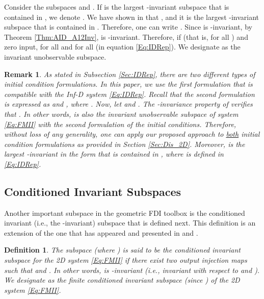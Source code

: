 \documentclass[journal,12pt,draftcls,onecolumn]{IEEEtran}
\def\QEDclosed{\hfill\IEEEQEDclosed}
\renewcommand{\qed}{\QEDclosed}
\newtheorem{remark}{Remark}
\newtheorem{definition}{Definition}
\begin{document}
Consider the subspaces  and . If  is the largest -invariant subspace that is contained in , we denote . We have shown in \cite{ACC2013} that , and it is the largest -invariant subspace that is contained in . Therefore,  one can write . Since  is -invariant, by Theorem \ref{Thm:AID_A12Inv},  is -invariant. Therefore, if  (that is,  for all ) and zero input,  for all  and  for all  (in equation \eqref{Eq:IDRep}). We designate   as the invariant unobservable subspace.
\begin{remark}\label{Rem:InitCond}
	As stated in Subsection \ref{Sec:IDRep}, there are two different types of initial condition formulations. In this paper, we use the first formulation that is compatible with the Inf-D system \eqref{Eq:IDRep}. Recall that the second formulation is expressed as  and , where .  Now, let  and . The -invariance property of  verifies that . In other words,  is also the invariant unobservable subspace of system \eqref{Eq:FMII} with the second formulation of the initial conditions. Therefore, without loss of any generality, one can apply our proposed approach to \underline{both} initial condition formulations as provided in Section \ref{Sec:Dis_2D}. Moreover,  is the largest -invariant in the form  that is contained in , where  is defined in \eqref{Eq:IDRep}.
\end{remark}


\subsection{Conditioned Invariant Subspaces}

Another important subspace in the geometric FDI toolbox is the conditioned invariant (i.e., the -invariant) subspace that is defined next. This definition is an extension of the one that has appeared and presented in \cite{conte1988GeometryConf} and \cite{conte1988GeometryArticle}.
\begin{definition}\label{Def:CondInv}
	The subspace  (where ) is said to be the conditioned invariant subspace for the 2D system \eqref{Eq:FMII} if there exist two output injection maps  such that  and
	. In other words,  is  -invariant (i.e., invariant with respect to  and ). We designate  as the finite conditioned invariant subspace (since ) of the 2D system \eqref{Eq:FMII}.\qed
\end{definition}
\end{document}
